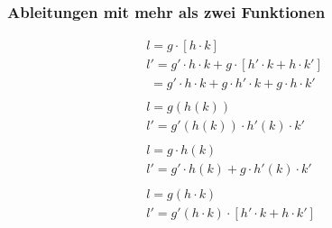 \subsubsection{Ableitungen mit mehr als zwei Funktionen}
\begin{gather*}
  l = g \cdot [h \cdot k] \\
  l' = g' \cdot h \cdot k + g \cdot [h' \cdot k + h \cdot k'] \\
  \;= g' \cdot h \cdot k + g \cdot h' \cdot k + g \cdot h \cdot k' \\\\
  l = g(h(k)) \\
  l' = g'(h(k)) \cdot h'(k) \cdot k' \\\\
  l = g \cdot h(k) \\
  l' = g' \cdot h(k) + g \cdot h'(k) \cdot k' \\\\
  l = g(h \cdot k) \\
  l' = g'(h \cdot k) \cdot [h' \cdot k + h \cdot k'] 
\end{gather*}
